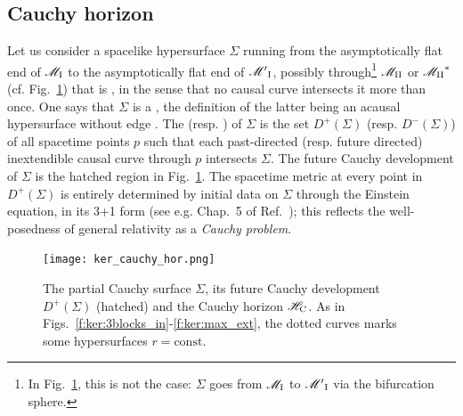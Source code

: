 \subsection{Cauchy horizon} \label{s:ker:Cauchy_hor}

Let us consider a spacelike hypersurface $\Sigma$ running from the asymptotically
flat end of $\mathscr{M}_{\rm I}$ to the asymptotically flat end of ${\mathscr{M}'}_{\rm I}$,
possibly through\footnote{In Fig.~\ref{f:ker:cauchy_hor},
this is not the case: $\Sigma$ goes from $\mathscr{M}_{\rm I}$ to
 ${\mathscr{M}'}_{\rm I}$ via the bifurcation sphere.} $\mathscr{M}_{\rm II}$ or ${\mathscr{M}_{\rm II}}^*$ (cf. Fig.~\ref{f:ker:cauchy_hor})
that is , in the
sense that no causal curve intersects it more than once. One says that $\Sigma$ is
a , the definition of the latter being
an acausal hypersurface without edge \cite{HawkiE73}.
The 
(resp. ) of
$\Sigma$ is the set $D^+(\Sigma)$ (resp. $D^-(\Sigma)$)
of all spacetime points $p$ such that each past-directed (resp. future directed) inextendible causal curve
through $p$ intersects $\Sigma$. The future Cauchy development of $\Sigma$ is
the hatched region in Fig.~\ref{f:ker:cauchy_hor}.
The spacetime metric at every point in $D^+(\Sigma)$ is entirely determined
by initial data on $\Sigma$ through the Einstein equation, in its 3+1 form
(see e.g. Chap.~5 of Ref.~\cite{Gourg12}); this reflects the well-posedness
of general relativity as a \emph{Cauchy problem}.

\begin{figure}
\centerline{\texttt{[image: ker\_cauchy\_hor.png]}}
\caption[]{\label{f:ker:cauchy_hor} \footnotesize
The partial Cauchy surface $\Sigma$, its future Cauchy development $D^+(\Sigma)$ (hatched)
and the Cauchy horizon $\mathscr{H}_{\rm C}$.
As in Figs.~\ref{f:ker:3blocks_in}-\ref{f:ker:max_ext},
the dotted curves marks some hypersurfaces $r=\mathrm{const}$.}
\end{figure}


